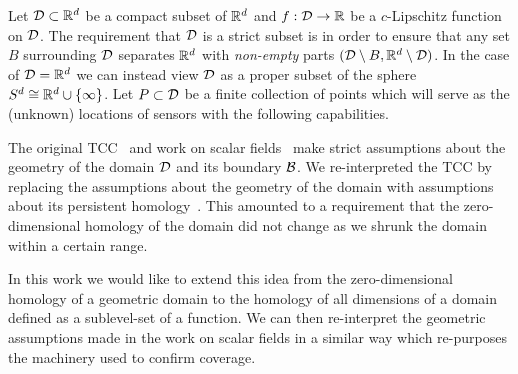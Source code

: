 
Let ${\mathcal{D}}\subset \mathbb{R}^d$ be a compact subset of $\mathbb{R}^d$ and $f:{\mathcal{D}}\to\mathbb{R}$ be a $c$-Lipschitz function on ${\mathcal{D}}$.
The requirement that ${\mathcal{D}}$ is a strict subset is in order to ensure that any set $B$ surrounding ${\mathcal{D}}$ separates $\mathbb{R}^d$ with \emph{non-empty} parts $({\mathcal{D}}\setminus B, \mathbb{R}^d\setminus{\mathcal{D}})$.
In the case of ${\mathcal{D}} = \mathbb{R}^d$ we can instead view ${\mathcal{D}}$ as a proper subset of the sphere $S^d\cong \mathbb{R}^d\cup\{\infty\}$.
Let $P\subset {\mathcal{D}}$ be a finite collection of points which will serve as the (unknown) locations of sensors with the following capabilities.

\vspace{3ex}
\begin{center}
\setlength{\fboxsep}{2ex}
\end{center}\vspace{3ex}

The original TCC~\cite{desilva07coverage} and work on scalar fields~\cite{chazal09analysis} make strict assumptions about the geometry of the domain ${\mathcal{D}}$ and its boundary ${\mathcal{B}}$.
We re-interpreted the TCC by replacing the assumptions about the geometry of the domain with assumptions about its persistent homology~\cite{cavanna2017when}.
This amounted to a requirement that the zero-dimensional homology of the domain did not change as we shrunk the domain within a certain range.

In this work we would like to extend this idea from the zero-dimensional homology of a geometric domain to the homology of all dimensions of a domain defined as a sublevel-set of a function.
We can then re-interpret the geometric assumptions made in the work on scalar fields in a similar way which re-purposes the machinery used to confirm coverage.

